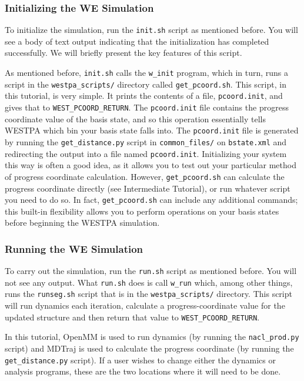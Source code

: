 \documentclass[9pt,tutorial,pubversion]{livecoms}
\begin{document}
\subsubsection{Initializing the WE Simulation}

To initialize the simulation, run the \verb|init.sh| script as mentioned before. 
You will see a body of text output indicating that the initialization has completed successfully. 
We will briefly present the key features of this script. 

As mentioned before, \verb|init.sh| calls the \verb|w_init| program, which in turn, runs a script in the \verb|westpa_scripts/| directory called \verb|get_pcoord.sh|. 
This script, in this tutorial, is very simple. 
It prints the contents of a file, \verb|pcoord.init|, and gives that to \verb|WEST_PCOORD_RETURN|.
The \verb|pcoord.init| file contains the progress coordinate value of the basis state, and so this operation essentially tells WESTPA which bin your basis state falls into. 
The \verb|pcoord.init| file is generated by running the \verb|get_distance.py| script in \verb|common_files/| on \verb|bstate.xml| and redirecting the output into a file named \verb|pcoord.init|. 
Initializing your system this way is often a good idea, as it allows you to test out your particular method of progress coordinate calculation.  
However, \verb|get_pcoord.sh| can calculate the progress coordinate directly (see Intermediate Tutorial), or run whatever script you need to do so.  
In fact, \verb|get_pcoord.sh| can include any additional commands; this built-in flexibility allows you to perform operations on your basis states before beginning the WESTPA simulation. 

\subsubsection{Running the WE Simulation}

To carry out the simulation, run the \verb|run.sh| script as mentioned before. 
You will not see any output. What \verb|run.sh| does is call \verb|w_run| which, among other things, runs the \verb|runseg.sh| script that is in the \verb|westpa_scripts/| directory. 
This script will run dynamics each iteration, calculate a progress-coordinate value for the updated structure and then return that value to \verb|WEST_PCOORD_RETURN|. 

In this tutorial, OpenMM is used to run dynamics (by running the \verb|nacl_prod.py| script) and MDTraj is used to calculate the progress coordinate (by running the \verb|get_distance.py| script).  
If a user wishes to change either the dynamics or analysis programs, these are the two locations where it will need to be done. 
\end{document}
